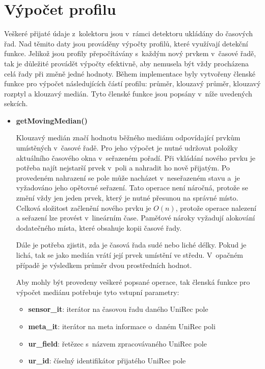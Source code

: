 \section{Výpočet profilu} \label{profileDef}
Veškeré přijaté údaje z~kolektoru jsou v~rámci detektoru ukládány do časových řad. Nad těmito 
daty jsou prováděny výpočty profilů, které využívají detekční funkce. Jelikož jsou profily
přepočítávány s~každým nový prvkem v~časové řadě, tak je důležité provádět výpočty efektivně, 
aby nemusela být vždy procházena celá řady při změně jedné hodnoty. Během implementace byly
vytvořeny členské funkce pro výpočet následujících částí profilu: průměr, klouzavý průměr, klouzavý rozptyl a
klouzavý medián. Tyto členské funkce jsou popsány v~níže uvedených sekcích.

\begin{itemize}
 \item \textbf{getMovingMedian()}%
 
 
 Klouzavý medián značí hodnotu běžného mediánu odpovídající prvkům umístěných v~časové řadě. 
 Pro jeho výpočet je nutné udržovat položky aktuálního časového okna v~seřazeném pořadí.
 Při vkládání nového prvku je potřeba najít nejstarší prvek v~poli a nahradit ho nově přijatým. 
 Po provedeném nahrazení se pole může nacházet v~neseřazeném stavu a~je 
 vyžadováno jeho opětovné seřazení.
  Tato operace není náročná, protože se změní vždy jen jeden prvek, který je nutné
 přesunou na správné místo. Celková složitost začlenění nového prvku je $O(n)$, protože operace 
 nalezení a seřazení lze provést v~lineárním čase. Paměťové nároky vyžadují alokování dodatečného
 místa, které obsahuje kopii časové řady.
 
 Dále je potřeba zjistit, zda je časová řada sudé nebo liché délky. Pokud je lichá, tak se jako 
 medián vrátí její prvek umístění ve středu. V~opačném případě je výsledkem průměr dvou prostředních
 hodnot.
 
 Aby mohly být provedeny veškeré popsané operace, tak členská funkce pro výpočet mediánu
 potřebuje tyto vstupní parametry:
 \begin{itemize}
   \item \textbf{sensor\_it}: iterátor na časovou řadu daného UniRec pole
   \item \textbf{meta\_it}: iterátor na meta informace o~daném UniRec poli
   \item \textbf{ur\_field}: řetězec s~názvem zpracovávaného UniRec pole
   \item \textbf{ur\_id}: číselný identifikátor přijatého UniRec pole
 \end{itemize}
 

\end{itemize}
